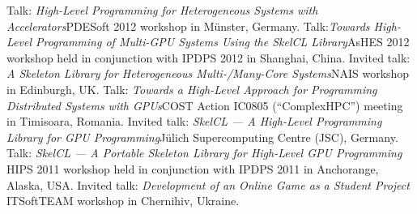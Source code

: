 \documentclass[11pt,a4paper]{moderncv}
\begin{document}
       {Talk: \emph{High-Level Programming for Heterogeneous Systems with
        Accelerators}\newline \small PDESoft 2012 workshop in Münster, Germany.}
       {Talk:\emph{Towards High-Level Programming of Multi-GPU Systems Using
        the SkelCL Library}\newline \small AsHES 2012 workshop held in
        conjunction with IPDPS 2012 in Shanghai, China.}
       {Invited talk: \emph{A Skeleton Library for Heterogeneous
        Multi-/Many-Core Systems}\newline \small NAIS workshop in Edinburgh, UK.}
       {Talk: \emph{Towards a High-Level Approach for Programming Distributed
        Systems with GPUs}\newline \small COST Action IC0805 (``ComplexHPC'')
        meeting in Timisoara, Romania.}
       {Invited talk: \emph{SkelCL --- A High-Level Programming Library for GPU
        Programming}\newline \small Jülich Supercomputing Centre (JSC), Germany.}
       {Talk: \emph{SkelCL --- A Portable Skeleton Library for High-Level
        GPU Programming}\newline
        \small HIPS 2011 workshop held in conjunction with IPDPS 2011 in
        Anchorange, Alaska, USA.}
       {Invited talk: \emph{Development of an Online Game as a Student Project}\newline
        \small ITSoftTEAM workshop in Chernihiv, Ukraine.}

\end{document}
